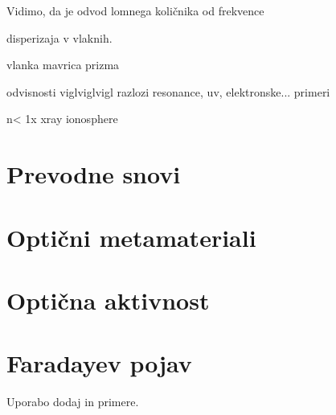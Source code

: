Vidimo, da je odvod
lomnega količnika od frekvence 

disperizaja v vlaknih.


vlanka
mavrica
prizma

odvisnosti
viglviglvigl razlozi resonance, uv, elektronske... 
primeri

n< 1x xray ionosphere


\section{Prevodne snovi}
\section{Optični metamateriali}
\section{Optična aktivnost}
\section{Faradayev pojav}
Uporabo dodaj in primere.
